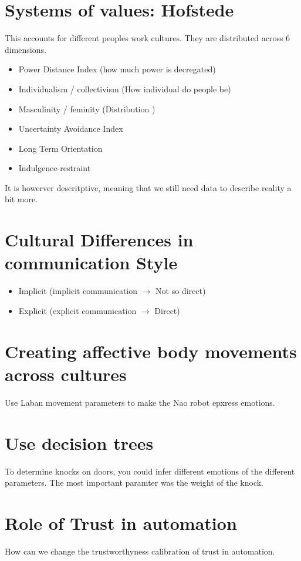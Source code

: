 \documentclass[a4paper]{article}
\begin{document}
\section{Systems of values: Hofstede}
This accounts for different peoples work cultures. They are distributed across 6 dimensions.

\begin{itemize}
	\item Power Distance Index (how much power is decregated)
	\item Individualism / collectivism (How individual do people be)
	\item Masculinity / feminity (Distribution )
	\item Uncertainty Avoidance Index 
	\item Long Term Orientation
	\item Indulgence-restraint
\end{itemize}
It is howerver descritptive, meaning that we still need data to describe reality a bit more. 


\section{Cultural Differences in communication Style}
\begin{itemize}
	\item Implicit (implicit communication $ \rightarrow $ Not so direct)
	\item Explicit (explicit communication $ \rightarrow $ Direct)
\end{itemize}


\section{Creating affective body movements across cultures}
Use Laban movement parameters to make the Nao robot epxress emotions. 

\section{Use decision trees}
To determine knocks on doors, you could infer different emotions of the different parameters. The most important paramter was the weight of the knock.

\section{Role of Trust in automation}
How can we change the trustworthyness calibration of trust in automation.
\end{document}
